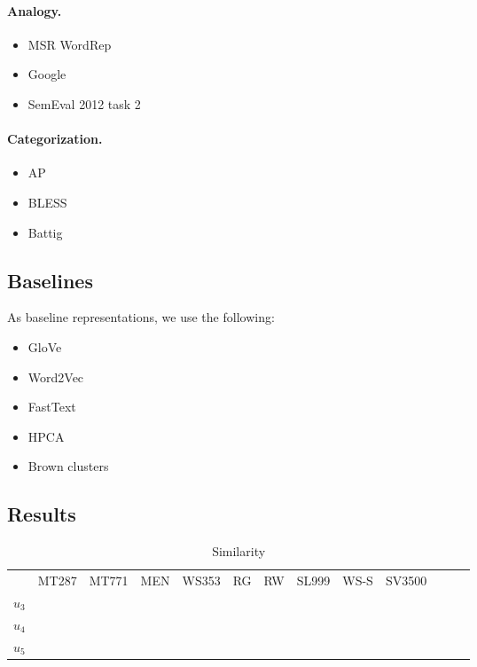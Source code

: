 \documentclass{article}
\begin{document}
    \paragraph{Analogy.}
    
    \begin{itemize}
        \item MSR WordRep~\cite{gao2014wordrep}
        \item Google~\cite{mikolov2013distributed}
        \item SemEval 2012 task 2~\cite{jurgens2012semeval}
    \end{itemize}
    
    \paragraph{Categorization.}
    
    \begin{itemize}
        \item AP~\cite{almuhareb2005concept}
        \item BLESS~\cite{baroni2011we}
        \item Battig~\cite{battig1969category}
    \end{itemize}
    
    
    \subsection{Baselines}\label{sec:baselinse}
    
    As baseline representations, we use the following:
    
    \begin{itemize}
        \item GloVe~\cite{pennington2014glove}
        \item Word2Vec~\cite{mikolov2013efficient}
        \item FastText~\cite{mikolov2018advances}
        \item HPCA~\cite{E14-1051}
        \item Brown clusters~\cite{brown1992class}
    \end{itemize}
    
    \subsection{Results}\label{sec:results}
    
    \begin{table}
        \begin{tabular}{l|cccccccccccc}
            & MT287 & MT771 & MEN & WS353 & RG & RW & SL999 & WS-S & SV3500 \\
            $u_3$ \\
            $u_4$ \\
            $u_5$
        \end{tabular}
        \caption{Similarity}\label{tab:results_sim}
    \end{table}
    
\end{document}
